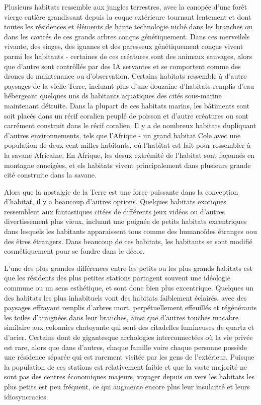 Plusieurs habitats ressemble aux jungles terrestres, avec la canopée d'une forêt vierge entière grandissant depuis la coque extérieure tournant lentement et dont toutes les résidences et éléments de haute technologie niché dans les branches ou dans les cavités de ces grands arbres conçus génétiquement. Dans ces merveilels vivante, des singes, des iguanes et des paresseux génétiquement conçus vivent parmi les habitants - certaines de ces créatures sont des animaux sauvages, alors que d'autre sont contrôllés par des IA servantes et se comportent comme des drones de maintenance ou d'observation. Certains habitats ressemble à d'autre paysages de la vielle Terre, incluant plus d'une douzaine d'habitats remplis d'eau hébergeant quelques uns ds habitants aquatiques des cités sous-marine maintenant détruite. Dans la plupart de ces habitats marins, les bâtiments sont soit placés dans un récif coralien peuplé de poisson et d'autre créatures ou sont carrément construit dans le récif coralien. Il y a de nombreux habitats dupliquant d'autres environnements, tels que l'Afrique - un grand habitat Cole avec une population de deux cent milles habitants, où l'habitat est fait pour ressembler à la savane Africaine. En Afrique, les desux extrémité de l'habitat sont façonnés en montagne enneigées, et els habitats vivent principalement dans plusieurs grande cité construite dans la savane. 

Alors que la nostalgie de la Terre est une force puissante dans la conception d'habitat, il y a beaucoup d'autres options. Quelques habitats exotiques ressemblent aux fantastiques citées de différents jeux vidéos ou d'autres divertissement plus vieux, incluant une poignée de petits habitats excentriques dans lesquels les habitants apparaissent tous comme des humanoïdes étranges oou des êtres étrangers. Dans beaucoup de ces habitats, les habitants se sont modifié cosmétiquement pour se fondre dans le décor. 

L'une des plus grandes différences entre les petits ou les plus grands habitats est que les résidents des plus petites stations partagent souvent une idéologie commune ou un sens esthétique, et sont donc bien plus excentrique. Quelques un des habitats les plus inhabituels vont des habitats faiblement éclairés, avec des paysages effrayant remplis d'arbres mort, perpétuellement effeuillés et régénérants les toiles d'araignées dans leur branches, ainsi que d'autres touches macabre similaire aux colonnies chatoyante qui sont des citadelles lumineuses de quartz et d'acier. Certains dont de gigantesque archologies interconnectées où la vie privée est rare, alors que dans d'autres, chaque famille voire chaque personne possède une résidence séparée qui est rarement visitée par les gens de l'extérieur. Puisque la population de ces stations est relativement faible et que la vaste majorité ne sont pas des centres économiques majeurs, voyager depuis ou vers les habitats les plus petits est peu fréquent, ce qui augmente encore plus leur insularité et leurs idiosyncracies. 

